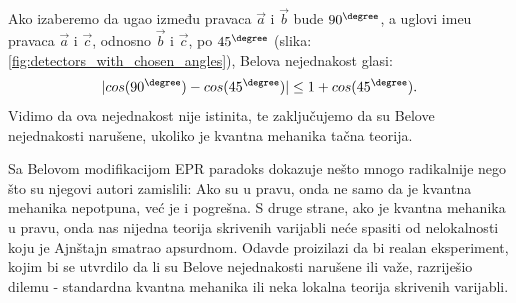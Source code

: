 \label{fig:detectors_with_chosen_angles}

Ako izaberemo da ugao između pravaca $\vec{a}$ i $\vec{b}$ bude $90^\degree$, a uglovi ime\dj u pravaca $\vec{a}$ i $\vec{c}$, odnosno $\vec{b}$ i $\vec{c}$, po $45^\degree$ (slika: \ref{fig:detectors_with_chosen_angles}), Belova nejednakost glasi:
\begin{equation*}
    | cos(90^\degree) - cos(45^\degree)|\le 1 + cos(45^\degree).
\end{equation*}
Vidimo da ova nejednakost nije istinita, te zaključujemo da su Belove nejednakosti narušene, ukoliko je kvantna mehanika tačna teorija.

Sa Belovom modifikacijom EPR paradoks dokazuje nešto mnogo radikalnije nego što su njegovi autori zamislili:
Ako su u pravu, onda ne samo da je kvantna mehanika nepotpuna, već je i pogrešna.
S druge strane, ako je kvantna mehanika u pravu, onda nas nijedna teorija skrivenih varijabli neće spasiti od nelokalnosti koju je Ajnštajn smatrao apsurdnom.
Odavde proizilazi da bi realan eksperiment, kojim bi se utvrdilo da li su Belove nejednakosti narušene ili važe, razriješio dilemu - standardna kvantna mehanika ili neka lokalna teorija skrivenih varijabli.
